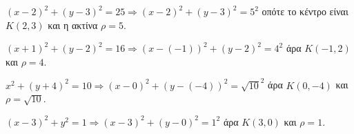 \begin{alist}
\item $ (x-2)^2+(y-3)^2=25\Rightarrow (x-2)^2+(y-3)^2=5^2 $ οπότε το κέντρο είναι $ K(2,3) $ και η ακτίνα $ \rho=5 $.
\item $ (x+1)^2+(y-2)^2=16\Rightarrow (x-(-1))^2+(y-2)^2=4^2 $ άρα $ K(-1,2) $ και $ \rho=4 $.
\item $ x^2+(y+4)^2=10\Rightarrow (x-0)^2+(y-(-4))^2=\sqrt{10}^2 $ άρα $ K(0,-4) $ και $ \rho=\sqrt{10} $.
\item $ (x-3)^2+y^2=1\Rightarrow (x-3)^2+(y-0)^2=1^2 $ άρα $ K(3,0) $ και $ \rho=1 $.
\end{alist}
